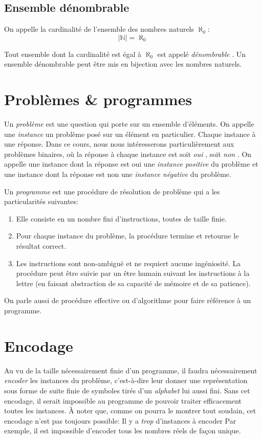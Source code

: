 \subsection{Ensemble dénombrable}

On appelle la cardinalité de l'ensemble des nombres naturels $\aleph_0$:
\[
|\mathbb{N}| = \aleph_0
\]

Tout ensemble dont la cardinalité est égal à $\aleph_0$ est appelé \og \textit{dénombrable} \fg{}.
Un ensemble dénombrable peut être mis en bijection avec les nombres naturels.

\section{Problèmes \& programmes}

Un \og \textit{problème} \fg{} est une question qui porte sur un ensemble d'éléments.
On appelle une \og \textit{instance} \fg{} un problème posé sur un élément en particulier.
Chaque instance à une réponse.
Dans ce cours, nous nous intéresserons particulièrement aux problèmes binaires, où la réponse à chaque instance est soit \og \textit{oui} \fg{}, soit \og \textit{non} \fg{}.
On appelle une instance dont la réponse est \og oui \fg{} une \og \textit{instance positive} \fg{} du problème et une instance dont la réponse est \og non \fg{} une \og \textit{instance négative} \fg{} du problème.

Un \og \textit{programme} \fg{} est une procédure de résolution de problème qui a les particularités suivantes:
\begin{enumerate}
\item
Elle consiste en un nombre fini d'instructions, toutes de taille finie.
\item
Pour chaque instance du problème, la procédure termine et retourne le résultat correct.
\item
Les instructions sont non-ambiguë et ne requiert aucune ingéniosité. La procédure peut être suivie par un être humain suivant les instructions à la lettre (en faisant abstraction de sa capacité de mémoire et de sa patience). 
\end{enumerate}
On parle aussi de \og procédure effective \fg{} ou d'\og algorithme \fg{} pour faire référence à un programme.

\section{Encodage}

Au vu de la taille nécessairement finie d'un programme, il faudra nécessairement \textit{encoder} les instances du problème, c'est-à-dire leur donner une représentation sous forme de suite finie de symboles tirés d'un \og \textit{alphabet} \fg{} lui aussi fini.
Sans cet encodage, il serait impossible au programme de pouvoir traiter efficacement toutes les instances.
À noter que, comme on pourra le montrer tout soudain, cet encodage n'est pas toujours possible:
Il y a \textit{trop} d'instances à encoder
Par exemple, il est impossible d'encoder tous les nombres réels de façon unique.

